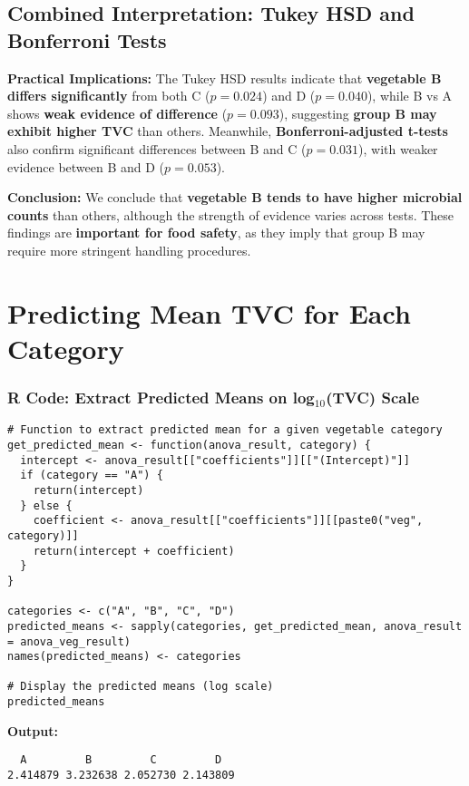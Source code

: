 \documentclass{article}
\begin{document}
\subsection*{Combined Interpretation: Tukey HSD and Bonferroni Tests}

\textbf{Practical Implications:} The Tukey HSD results indicate that \textbf{vegetable B differs significantly} from both C ($p = 0.024$) and D ($p = 0.040$), while B vs A shows \textbf{weak evidence of difference} ($p = 0.093$), suggesting \textbf{group B may exhibit higher TVC} than others. Meanwhile, \textbf{Bonferroni-adjusted t-tests} also confirm significant differences between B and C ($p = 0.031$), with weaker evidence between B and D ($p = 0.053$).

\vspace{0.5em}
\noindent\textbf{Conclusion:} We conclude that \textbf{vegetable B tends to have higher microbial counts} than others, although the strength of evidence varies across tests. These findings are \textbf{important for food safety}, as they imply that group B may require more stringent handling procedures.


\section*{ Predicting Mean TVC for Each Category}

\subsubsection*{R Code: Extract Predicted Means on log$_{10}$(TVC) Scale}
\begin{verbatim}
# Function to extract predicted mean for a given vegetable category
get_predicted_mean <- function(anova_result, category) {
  intercept <- anova_result[["coefficients"]][["(Intercept)"]]
  if (category == "A") {
    return(intercept)
  } else {
    coefficient <- anova_result[["coefficients"]][[paste0("veg", category)]]
    return(intercept + coefficient)
  }
}

categories <- c("A", "B", "C", "D")
predicted_means <- sapply(categories, get_predicted_mean, anova_result = anova_veg_result)
names(predicted_means) <- categories

# Display the predicted means (log scale)
predicted_means
\end{verbatim}

\textbf{Output:}
\begin{verbatim}
  A         B         C         D 
2.414879 3.232638 2.052730 2.143809 
\end{verbatim}
\end{document}
